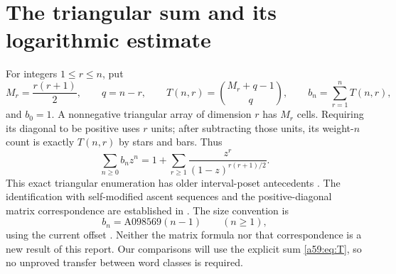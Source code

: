\documentclass[11pt,letterpaper]{article}
\theoremstyle{remark}\newtheorem{remark}[theorem]{Remark}
\theoremstyle{remark}\newtheorem{wremark}{Remark}\renewcommand{\thewremark}{W\arabic{wremark}}
\theoremstyle{plain}\newtheorem{wcorollary}[wremark]{Corollary}
\begin{document}
\section{The triangular sum and its logarithmic estimate}\label{a59:sec:triangular}
For integers $1\le r\le n$, put
\begin{equation}\label{a59:eq:T}
 M_r=\frac{r(r+1)}2,\qquad q=n-r,\qquad
 T(n,r)=\binom{M_r+q-1}{q},\qquad b_n=\sum_{r=1}^n T(n,r),
\end{equation}
and $b_0=1$. A nonnegative triangular array of dimension $r$ has $M_r$ cells. Requiring its diagonal to be positive uses $r$ units; after subtracting those units, its weight-$n$ count is exactly $T(n,r)$ by stars and bars. Thus
\[
 \sum_{n\ge0}b_nz^n=1+\sum_{r\ge1}\frac{z^r}{(1-z)^{r(r+1)/2}}.
\]
This exact triangular enumeration has older interval-poset antecedents \cite{bayoumi,khamis}. The identification with self-modified ascent sequences and the positive-diagonal matrix correspondence are established in \cite{bcdk,dukes}. The size convention is
\begin{equation}\label{a59:eq:shift}
 b_n=\mathrm{A098569}(n-1)\qquad(n\ge1),
\end{equation}
using the current offset \cite{oeistriangular}. Neither the matrix formula nor that correspondence is a new result of this report. Our comparisons will use the explicit sum \eqref{a59:eq:T}, so no unproved transfer between word classes is required.
\end{document}
